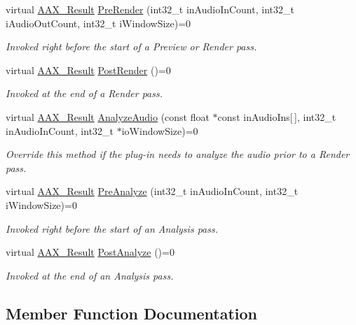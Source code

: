 \begin{DoxyCompactItemize}
virtual \hyperlink{a00149_a4d8f69a697df7f70c3a8e9b8ee130d2f}{A\+A\+X\+\_\+\+Result} \hyperlink{a00066_aac48c69e51b81cc59c7b6807c1c7f9ed}{Pre\+Render} (int32\+\_\+t in\+Audio\+In\+Count, int32\+\_\+t i\+Audio\+Out\+Count, int32\+\_\+t i\+Window\+Size)=0
\begin{DoxyCompactList}\small\item\em Invoked right before the start of a Preview or Render pass. \end{DoxyCompactList}\item 
virtual \hyperlink{a00149_a4d8f69a697df7f70c3a8e9b8ee130d2f}{A\+A\+X\+\_\+\+Result} \hyperlink{a00066_afafcab62ae4b4174a9f81350bba2da9f}{Post\+Render} ()=0
\begin{DoxyCompactList}\small\item\em Invoked at the end of a Render pass. \end{DoxyCompactList}\item 
virtual \hyperlink{a00149_a4d8f69a697df7f70c3a8e9b8ee130d2f}{A\+A\+X\+\_\+\+Result} \hyperlink{a00066_a8a1710040b8ae79248383ab1bf17e6b6}{Analyze\+Audio} (const float $\ast$const in\+Audio\+Ins\mbox{[}$\,$\mbox{]}, int32\+\_\+t in\+Audio\+In\+Count, int32\+\_\+t $\ast$io\+Window\+Size)=0
\begin{DoxyCompactList}\small\item\em Override this method if the plug-\/in needs to analyze the audio prior to a Render pass. \end{DoxyCompactList}\item 
virtual \hyperlink{a00149_a4d8f69a697df7f70c3a8e9b8ee130d2f}{A\+A\+X\+\_\+\+Result} \hyperlink{a00066_a7d816bdb7b3b683aa2245a179d61d70e}{Pre\+Analyze} (int32\+\_\+t in\+Audio\+In\+Count, int32\+\_\+t i\+Window\+Size)=0
\begin{DoxyCompactList}\small\item\em Invoked right before the start of an Analysis pass. \end{DoxyCompactList}\item 
virtual \hyperlink{a00149_a4d8f69a697df7f70c3a8e9b8ee130d2f}{A\+A\+X\+\_\+\+Result} \hyperlink{a00066_a3b42c24c578987ab8dc6127ccc7d15b3}{Post\+Analyze} ()=0
\begin{DoxyCompactList}\small\item\em Invoked at the end of an Analysis pass. \end{DoxyCompactList}\end{DoxyCompactItemize}


\subsection{Member Function Documentation}
\hypertarget{a00066_a00aa7da380e86cd79c6b8da1aa51c3b7}{}
